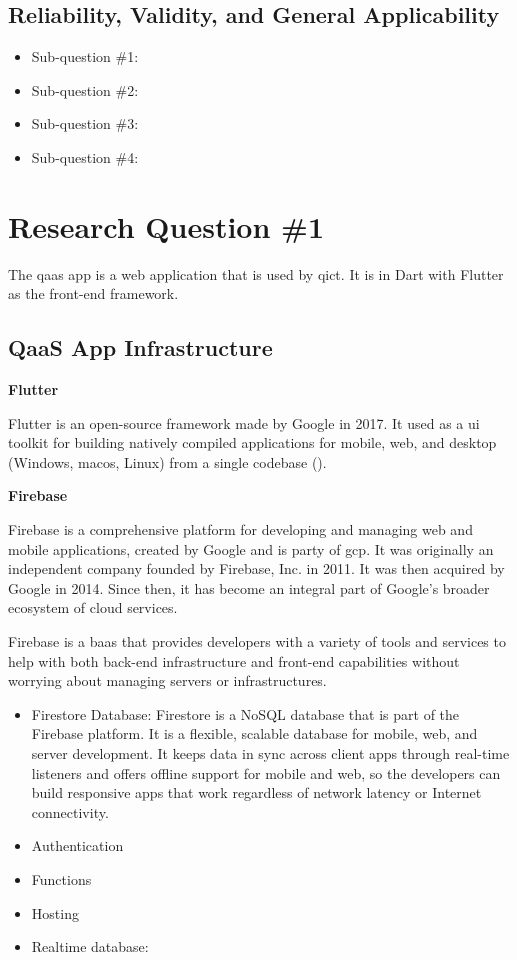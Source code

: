 \begin{multicols}{2}
      \subsection{Reliability, Validity, and General Applicability}
      \begin{itemize}[label=-]
            \item Sub-question \#1:
            \item Sub-question \#2:
            \item Sub-question \#3:
            \item Sub-question \#4:
      \end{itemize}
      \section{Research Question \#1}
      The \acrshort{qaas} app is a web application that is used by \acrshort{qict}. It is in Dart with Flutter as
      the front-end framework.

      \subsection{QaaS App Infrastructure}
      \textbf{Flutter}

      Flutter is an open-source framework made by Google in 2017. It used as a \acrshort{ui} toolkit for building
      natively compiled applications for mobile, web, and desktop (Windows, mac\acrshort{os}, Linux) from a single
      codebase (\cite{flutter}).

      \textbf{Firebase}

      Firebase is a comprehensive platform for developing and managing web and mobile applications, created by
      Google and is party of \acrshort{gcp}. It was originally an independent company founded by Firebase, Inc.
      in 2011. It was then acquired by Google in 2014. Since then, it has become an integral part of Google's
      broader ecosystem of cloud services.

      Firebase is a \acrshort{baas} that provides developers with a variety of tools and services to help with both
      back-end infrastructure and front-end capabilities without worrying about managing servers or infrastructures.
      \begin{itemize}
            \item Firestore Database: Firestore is a NoSQL database that is part of the Firebase platform. It is a
                  flexible, scalable database for mobile, web, and server development. It keeps data in sync across
                  client apps through real-time listeners and offers offline support for mobile and web, so the
                  developers can build responsive apps that work regardless of network latency or Internet
                  connectivity.
            \item Authentication
            \item Functions
            \item Hosting
            \item Realtime database:
      \end{itemize}


\end{multicols}
